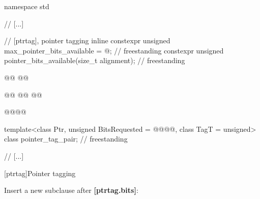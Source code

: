\documentclass{wg21}
\newcommand{\editinstr}[1]{\textcolor{noteclr}{#1}}
\begin{document}
\begin{codeblock}
namespace std {
  // [...]

  // [ptrtag], pointer tagging
  inline constexpr unsigned max_pointer_bits_available = @\seebelownc@;                 // freestanding
  constexpr unsigned pointer_bits_available(size_t alignment);                      // freestanding

  @@ @@

  @@
  @@ @\removed{// \expos}@

  @@@\removed{// \expos}@

  template<class Ptr, unsigned BitsRequested = @@@@,
           class TagT = unsigned>
    class pointer_tag_pair;                                                         // freestanding

  // [...]
}
\end{codeblock}

[ptrtag]{Pointer tagging}

\editinstr{Insert a new subclause after \textbf{[ptrtag.bits]}:}
\end{document}
